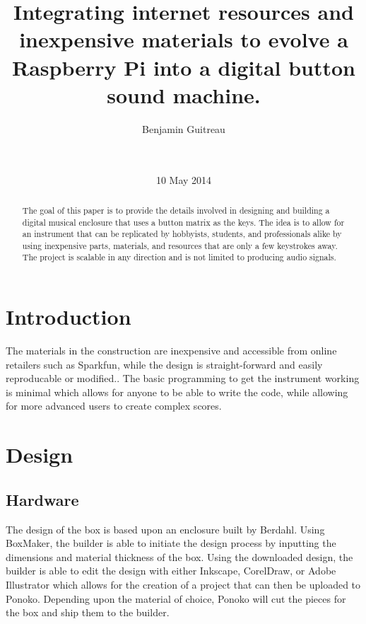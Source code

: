 \documentclass{nime-alternate}
\begin{document}

\title{Integrating internet resources and inexpensive materials to evolve a 
Raspberry Pi into a digital button sound machine. }


\author{
\alignauthor
Benjamin Guitreau\\
\\
\\
}

\date{10 May 2014}

\maketitle
\begin{abstract}
The goal of this paper is to provide the details involved in designing and building 
a digital musical enclosure that uses a button matrix as the keys. The idea is to allow for an instrument that can be replicated by hobbyists, students, and professionals alike by using inexpensive parts, materials, and resources that are only a few keystrokes away. The project is scalable in any direction and is not limited to producing audio signals. 
\end{abstract}


\section{Introduction}
The materials 
in the construction are inexpensive and accessible from online retailers such as Sparkfun\cite{SF}, while the design is straight-forward and easily reproducable or modified.. The basic programming to get the instrument working is minimal which allows for anyone to be able to write the code, while allowing for more advanced users to create complex scores.

\section{Design}

\subsection{Hardware}
The design of the box is based upon an enclosure built by Berdahl\cite{Berdahl:2014:Misc}. Using BoxMaker\cite{Bhargava:2013:Misc}, the builder is able to initiate the design process by inputting the dimensions and material thickness of the box. Using the downloaded design, the builder is able to edit the design with either Inkscape, CorelDraw, or Adobe Illustrator which allows for the creation of a project that can then be uploaded to Ponoko\cite{Ponoko}. Depending upon the material of choice, Ponoko will cut the pieces for the box and ship them to the builder.
\end{document}
